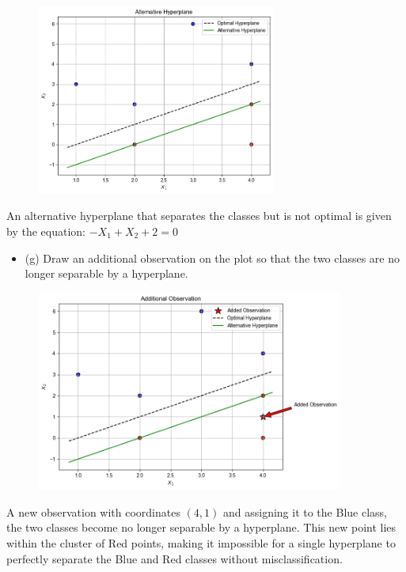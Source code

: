 \documentclass[11pt]{article}
\begin{document}
	
	\begin{figure}[H]
		\centering
		\includegraphics[width=0.7\textwidth]{figures/figure1.png}
	\end{figure}
	
	
	An alternative hyperplane that separates the classes but is not optimal is given by the equation: $-X_{1}+X_{2}+2=0$
	
	\begin{itemize}
		\item (g) Draw an additional observation on the plot so that the two classes are no longer separable by a hyperplane.
	\end{itemize}
	
	
	\begin{figure}[H]
		\centering
		\includegraphics[width=0.9\textwidth]{figures/figure2.png}
	\end{figure}
	
	
	A new observation with coordinates $(4,1)$ and assigning it to the Blue class, the two classes become no longer separable by a hyperplane. This new point lies within the cluster of Red points, making it impossible for a single hyperplane to perfectly separate the Blue and Red classes without misclassification.
	
\end{document}
